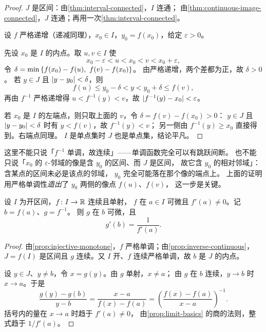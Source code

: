 \begin{proof}
  \(J\) 是区间：由\cref{thm:interval-connected}，\(I\) 连通；
  由\cref{thm:continuous-image-connected}，\(J\) 连通；再用一次\cref{thm:interval-connected}。

  设 \(f\) 严格递增（递减同理），\(x_{0} \in I\)，\(y_{0}=f(x_{0})\)，给定 \(\varepsilon>0\)。

  先设 \(x_{0}\) 是 \(I\) 的内点。取 \(u,v \in I\) 使
  \[
    x_{0}-\varepsilon < u < x_{0} < v < x_{0}+\varepsilon ,
  \]
  令 \(\delta = \min\set{f(x_{0})-f(u),\ f(v)-f(x_{0})}\)。
  由严格递增，两个差都为正，故 \(\delta>0\)。
  若 \(y \in J\) 且 \(\lvert y-y_{0}\rvert<\delta\)，则
  \[
    f(u) \le y_{0}-\delta < y < y_{0}+\delta \le f(v) ,
  \]
  再由 \(f^{-1}\) 严格递增得 \(u < f^{-1}(y) < v\)，故 \(\lvert f^{-1}(y)-x_{0}\rvert<\varepsilon\)。

  若 \(x_{0}\) 是 \(I\) 的左端点，则只取上面的 \(v\)，令 \(\delta = f(v)-f(x_{0})>0\)：
  \(y \in J\) 且 \(\lvert y-y_{0}\rvert<\delta\) 时有 \(y<f(v)\)，故 \(f^{-1}(y)<v\)；
  另一侧由 \(f^{-1}(y) \ge x_{0}\) 直接得到。右端点同理。
  \(I\) 是单点集时 \(J\) 也是单点集，结论平凡。
\end{proof}

\begin{pitfall}
  这里不能只说「\(f^{-1}\) 单调，故连续」——单调函数完全可以有跳跃间断。
  也不能只说「\(x_{0}\) 的 \(\varepsilon\)-邻域的像是含 \(y_{0}\) 的区间、而 \(J\) 是区间，
  故它含 \(y_{0}\) 的相对邻域」：含某点的区间未必是该点的邻域，
  \(y_{0}\) 完全可能落在那个像的端点上。
  上面的证明用严格单调性\emph{造出}了 \(y_{0}\) 两侧的像点 \(f(u)\)、\(f(v)\)，
  这一步是关键。
\end{pitfall}

\begin{theorem}[逆可微]
  \label{thm:inverse-differentiable}
  设 \(I\) 为开区间，\(f \colon I \to \mathbb{R}\) 连续且单射，
  \(f\) 在 \(a \in I\) 可微且 \(f'(a) \neq 0\)。记 \(b=f(a)\)、\(g=f^{-1}\)。
  则 \(g\) 在 \(b\) 可微，且
  \[
    g'(b) = \frac{1}{f'(a)} .
  \]
\end{theorem}

\begin{proof}
  由\cref{prop:injective-monotone}，\(f\) 严格单调；由\cref{prop:inverse-continuous}，
  \(J=f(I)\) 是区间且 \(g\) 连续。又 \(I\) 开、\(f\) 连续严格单调，故 \(b\) 是 \(J\) 的内点。

  设 \(y \in J\)、\(y \neq b\)，令 \(x = g(y)\)。由 \(g\) 单射，\(x \neq a\)；
  由 \(g\) 在 \(b\) 连续，\(y \to b\) 时 \(x \to a\)。于是
  \[
    \frac{g(y)-g(b)}{y-b} = \frac{x-a}{f(x)-f(a)}
      = \left(\frac{f(x)-f(a)}{x-a}\right)^{-1} .
  \]
  括号内的量在 \(x \to a\) 时趋于 \(f'(a) \neq 0\)，
  由\cref{prop:limit-basics} 的商的法则，整式趋于 \(1/f'(a)\)。
\end{proof}

